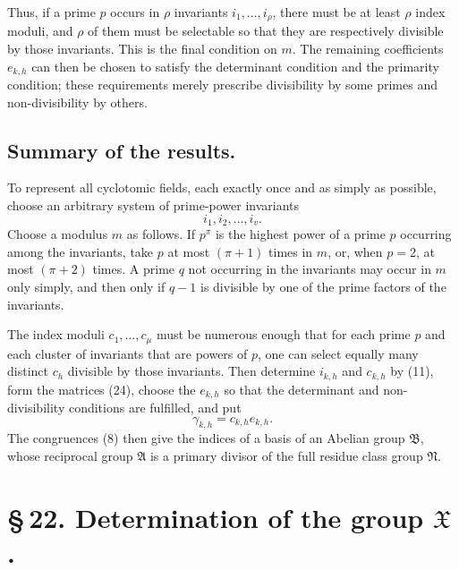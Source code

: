 \documentclass[11pt]{article}
\providecommand{\grpA}{\mathfrak A}
\providecommand{\grpB}{\mathfrak B}
\providecommand{\grpN}{\mathfrak N}
\providecommand{\grpX}{\mathfrak X}
\begin{document}
Thus, if a prime $p$ occurs in $\rho$ invariants $i_1,
\ldots,i_\rho$, there must be at least $\rho$ index moduli, and $\rho$ of them must be selectable so that they are respectively divisible by those invariants. This is the final condition on $m$. The remaining coefficients $e_{k,h}$ can then be chosen to satisfy the determinant condition and the primarity condition; these requirements merely prescribe divisibility by some primes and non-divisibility by others.

\subsection*{Summary of the results.}

To represent all cyclotomic fields, each exactly once and as simply as possible, choose an arbitrary system of prime-power invariants
\[
 i_1,i_2,
\ldots,i_v.
\]
Choose a modulus $m$ as follows. If $p^\pi$ is the highest power of a prime $p$ occurring among the invariants, take $p$ at most $(\pi+1)$ times in $m$, or, when $p=2$, at most $(\pi+2)$ times. A prime $q$ not occurring in the invariants may occur in $m$ only simply, and then only if $q-1$ is divisible by one of the prime factors of the invariants.

The index moduli $c_1,
\ldots,c_\mu$ must be numerous enough that for each prime $p$ and each cluster of invariants that are powers of $p$, one can select equally many distinct $c_h$ divisible by those invariants. Then determine $i_{k,h}$ and $c_{k,h}$ by (11), form the matrices (24), choose the $e_{k,h}$ so that the determinant and non-divisibility conditions are fulfilled, and put
\[
 \gamma_{k,h}=c_{k,h}e_{k,h}.
\]
The congruences (8) then give the indices of a basis of an Abelian group $\grpB$, whose reciprocal group $\grpA$ is a primary divisor of the full residue class group $\grpN$.

\section*{\S\,22. Determination of the group $\grpX$.}
\end{document}
